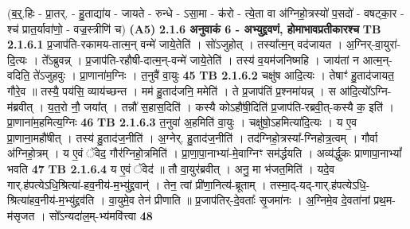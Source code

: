 \documentclass[17pt]{extarticle}
\begin{document}
                  \newline
                                    (ब॒र्॒.हिः - प्रा॒तर्. - हु॒ताद्या॑य - जायते - रुन्धे - ऽसा॒मा - क॑रो - त्ये॒ता वा अ॑ग्निहो॒त्रस्यो॑ प॒सदो॑ - वषट्का॒र - श्च॑ प्रात॒र्यावा॑णो॒ - वज्र॒स्त्रीणि॑ च) \textbf{(A5)} \newline \newline
                \textbf{ 2.1.6     अनुवाकं   6 - अभ्युद्द्रवणं, होमाभावप्रतीकारश्च} \newline
                                \textbf{ TB 2.1.6.1} \newline
                  प्र॒जाप॑ति-रकामय-तात्म॒न् वन्मे॑ जाये॒तेति॑ । सो॑ऽजुहोत् । तस्या᳚त्म॒न् वद॑जायत । अ॒ग्निर्-वा॒युरा॑-दि॒त्यः । ते᳚ऽब्रुवन्न् । प्र॒जाप॑ति-रहौषी-दात्म॒न्-वन्मे॑ जाये॒तेति॑ । तस्य॑ व॒यम॑जनिष्महि । जाय॑तां न आत्म॒न्-वदिति॒ ते॑ऽजुहवुः । प्रा॒णाना॑म॒ग्निः । त॒नुवै॑ वा॒युः \textbf{ 45} \newline
                  \newline
                                \textbf{ TB 2.1.6.2} \newline
                  चक्षु॑ष आदि॒त्यः । तेषाꣳ॑ हु॒ताद॑जायत॒ गौरे॒व ॥ तस्यै॒ पय॑सि॒ व्याय॑च्छन्त । मम॑ हु॒ताद॑जनि॒ ममेति॑ । ते प्र॒जाप॑तिं प्र॒श्नमा॑यन्न् । स आ॑दि॒त्यो᳚ऽग्नि-म॑ब्रवीत् । य॒त॒रो नौ॒ जया᳚त् । तन्नौ॑ स॒हास॒दिति॑ । कस्यै कोऽहौ॑षी॒दिति॑ प्र॒जाप॑ति-रब्रवी॒त्-कस्यै क॒ इति॑ । प्रा॒णाना॑म॒हमित्य॒ग्निः \textbf{ 46} \newline
                  \newline
                                \textbf{ TB 2.1.6.3} \newline
                  त॒नुवा॑ अ॒हमिति॑ वा॒युः । चक्षु॑षो॒ऽहमित्या॑दि॒त्यः । य ए॒व प्रा॒णाना॒महौ॑षीत् । तस्य॑ हु॒ताद॑ज॒नीति॑ । अ॒ग्नेर्. हु॒ताद॑ज॒नीति॑ । तद॑ग्निहो॒त्रस्या᳚-ग्निहोत्र॒त्वम् । गौर्वा अ॑ग्निहो॒त्रम् । य ए॒वं ॅवेद॒ गौर॑ग्निहो॒त्रमिति॑ । प्रा॒णा॒पा॒नाभ्या॑-मे॒वाग्निꣳ सम॑र्द्धयति । अव्य॑र्द्धुकः प्राणापा॒नाभ्यां᳚ भवति \textbf{ 47} \newline
                  \newline
                                \textbf{ TB 2.1.6.4} \newline
                  य ए॒वं ॅवेद॑ ॥ तौ वा॒युर॑ब्रवीत् । अनु॒ मा भ॑जत॒मिति॑ । यदे॒व गार्.ह॑पत्येऽधि॒श्रित्या॑-हव॒नीय॑-म॒भ्यु॑द्द्रवान्॑ । तेन॒ त्वां प्री॑णा॒नित्य॑-ब्रूताम् । तस्मा॒द्-यद्-गार्.ह॑पत्येऽधि॒-श्रित्या॑हव॒नीय॑-म॒भ्यु॑द्द्रव॑ति । वा॒युमे॒व तेन॑ प्रीणाति ॥ प्र॒जाप॑तिर्-दे॒वताः᳚ सृ॒जमा॑नः । अ॒ग्निमे॒व दे॒वता॑नां प्रथ॒म-म॑सृजत । सो᳚ऽन्यदा॑ल॒म्-भ्य॑मवि॑त्त्वा \textbf{ 48} \newline
\end{document}
